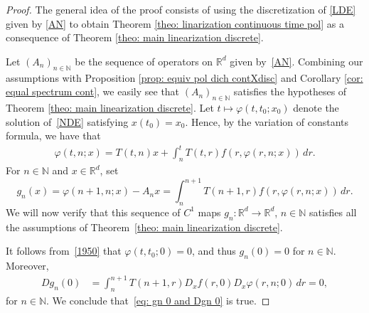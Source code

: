 \documentclass[10pt,a4paper]{amsart}
\def\N{\mathbb{N}}
\def\R{\mathbb{R}}
\renewcommand{\phi}{\varphi}
\begin{document}
\begin{proof} The general idea of the proof consists of using the discretization of \eqref{LDE} given by \eqref{AN} to obtain Theorem \ref{theo: linarization continuous time pol} as a consequence of Theorem \ref{theo: main linearization discrete}.


Let $(A_n)_{n\in \N}$ be the sequence of operators on $\R^d$ given by~\eqref{AN}. Combining our assumptions with Proposition \ref{prop: equiv pol dich contXdisc} and Corollary \ref{cor: equal spectrum cont}, we easily see that $(A_n)_{n\in \N}$ satisfies the hypotheses of Theorem \ref{theo: main linearization discrete}. Let $t\mapsto \varphi (t, t_0; x_0)$ denote the solution of~\eqref{NDE} satisfying $x(t_0)=x_0$. Hence, by the variation of constants formula, we have that 
\begin{align}\label{def-phi}
\phi(t, n; x)=T(t,n)x+\int_n^t T(t,r)f(r, \phi(r, n;x))\, dr.
\end{align}
For $n\in \N$ and $x\in \R^d$, set 
\begin{equation}\label{eq: def gn cont case}
g_n(x)=\phi(n+1, n;x)-A_n x=\int_n^{n+1}T(n+1, r)f(r, \phi(r,n;x))\, dr.
\end{equation}
We will now verify that this sequence of $C^1$ maps $g_n:\mathbb{R}^d\to \mathbb{R}^d$, $n\in \N$ satisfies all the assumptions of Theorem~\ref{theo: main linearization discrete}.

It follows from~\eqref{1950} that  $\phi(t, t_0;0)=0$, and thus $g_n(0)=0$ for $n\in \N$. Moreover, 
\[
\begin{split}
Dg_n(0)
&=\int_n^{n+1}T(n+1, r)D_xf(r, 0)D_x \phi(r,n;0)\, dr =0,
\end{split}
\]
for $n\in \N$. We conclude that~\eqref{eq: gn 0 and Dgn 0} is true.


\end{proof}
\end{document}
